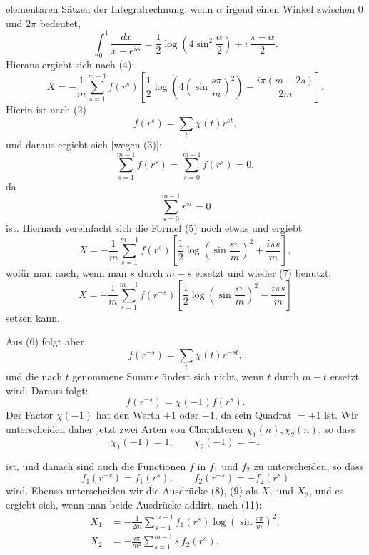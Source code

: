 \documentclass[11pt]{article}
\begin{document}
elementaren Sätzen der Integralrechnung, wenn $\alpha$ irgend einen Winkel zwischen $0$ und $2\pi$ bedeutet,
\[
\int_0^1\frac{dx}{x-e^{i\alpha}}
=\frac12\log\left(4\sin^2\frac{\alpha}{2}\right)
+i\,\frac{\pi-\alpha}{2}.
\]
Hieraus ergiebt sich nach (4):
\begin{equation}
X=-\frac1m\sum_{s=1}^{m-1}f(r^s)
\left[\frac12\log\left(4\left(\sin\frac{s\pi}{m}\right)^2\right)-\frac{i\pi(m-2s)}{2m}\right].
\tag{5}
\end{equation}
Hierin ist nach (2)
\begin{equation}
f(r^s)=\sum_t\chi(t)r^{st},
\tag{6}
\end{equation}
und daraus ergiebt sich [wegen (3)]:
\begin{equation}
\sum_{s=1}^{m-1}f(r^s)=\sum_{s=0}^{m-1}f(r^s)=0,
\tag{7}
\end{equation}
da
\[
\sum_{s=0}^{m-1}r^{st}=0
\]
ist. Hiernach vereinfacht sich die Formel (5) noch etwas und ergiebt
\begin{equation}
X=-\frac1m\sum_{s=1}^{m-1}f(r^s)
\left[\frac12\log\left(\sin\frac{s\pi}{m}\right)^2+\frac{i\pi s}{m}\right],
\tag{8}
\end{equation}
wofür man auch, wenn man $s$ durch $m-s$ ersetzt und wieder (7) benutzt,
\begin{equation}
X=-\frac1m\sum_{s=1}^{m-1}f(r^{-s})
\left[\frac12\log\left(\sin\frac{s\pi}{m}\right)^2-\frac{i\pi s}{m}\right]
\tag{9}
\end{equation}
setzen kann.

Aus (6) folgt aber
\[
f(r^{-s})=\sum_t\chi(t)r^{-st},
\]
und die nach $t$ genommene Summe ändert sich nicht, wenn $t$ durch $m-t$ ersetzt wird. Daraus folgt:
\[
f(r^{-s})=\chi(-1)f(r^s).
\]
Der Factor $\chi(-1)$ hat den Werth $+1$ oder $-1$, da sein Quadrat $=+1$ ist. Wir unterscheiden daher jetzt zwei Arten von Charakteren $\chi_1(n),\chi_2(n)$, so dass
\begin{equation}
\chi_1(-1)=1,\qquad \chi_2(-1)=-1
\tag{10}
\end{equation}

ist, und danach sind auch die Functionen $f$ in $f_1$ und $f_2$ zu unterscheiden, so dass
\begin{equation}
f_1(r^{-s})=f_1(r^s),\qquad f_2(r^{-s})=-f_2(r^s)
\tag{11}
\end{equation}
wird. Ebenso unterscheiden wir die Ausdrücke (8), (9) als $X_1$ und $X_2$, und es ergiebt sich, wenn man beide Ausdrücke addirt, nach (11):
\begin{equation}
\begin{aligned}
X_1&=-\frac1{2m}\sum_{s=1}^{m-1}f_1(r^s)\log\left(\sin\frac{s\pi}{m}\right)^2,\\
X_2&=-\frac{i\pi}{m^2}\sum_{s=1}^{m-1}s\,f_2(r^s).
\end{aligned}
\tag{12}
\end{equation}
\end{document}
